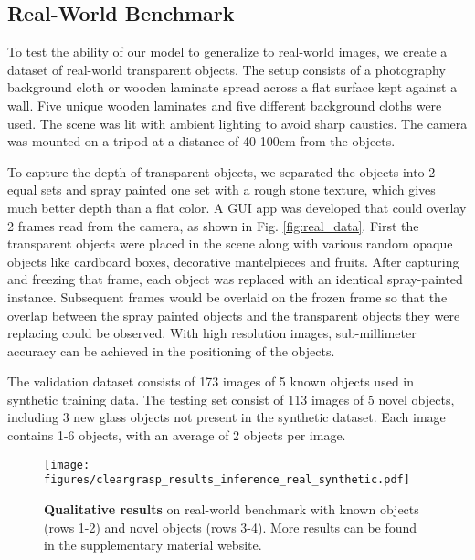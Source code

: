 \documentclass[letterpaper, 10 pt, conference]{ieeeconf}
\begin{document}
\subsection{Real-World Benchmark}
\label{sec:data-real}
To test the ability of our model to generalize to real-world images, we create a dataset of real-world transparent objects.
The setup consists of a photography background cloth or wooden laminate spread across a flat surface kept against a wall. Five unique wooden laminates and five different background cloths were used. 
The scene was lit with ambient lighting to avoid sharp caustics.
The camera was mounted on a tripod at a distance of 40-100cm from the objects.

To capture the depth of transparent objects, we separated the objects into 2 equal sets and spray painted one set with a rough stone texture, which gives much better depth than a flat color. 
A GUI app was developed that could overlay 2 frames read from the camera, as shown in Fig. \ref{fig:real_data}. First the transparent objects were placed in the scene along with various random opaque objects like cardboard boxes, decorative mantelpieces and fruits. After capturing and freezing that frame, each object was replaced with an identical spray-painted instance. Subsequent frames would be overlaid on the frozen frame so that the overlap between the spray painted objects and the transparent objects they were replacing could be observed. With high resolution images, sub-millimeter accuracy can be achieved in the positioning of the objects.

The validation dataset consists of 173 images of 5 known objects used in synthetic training data. The testing set consist of 113 images of 5 novel objects, including 3 new glass objects not present in the synthetic dataset. Each image contains 1-6 objects, with an average of 2 objects per image.

\begin{figure*}[t]
    \centering
    \vspace{-2mm}
    \texttt{[image: figures/cleargrasp\_results\_inference\_real\_synthetic.pdf]}\vspace{-2mm}
    \caption{\textbf{Qualitative results} on real-world benchmark with known objects (rows 1-2) and novel objects (rows 3-4). More results can be found in the supplementary material website.}
    \label{fig:results_collage}
    \vspace{-4mm}
\end{figure*}
\end{document}
